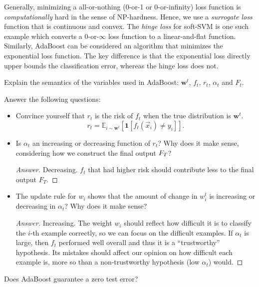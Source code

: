 \documentclass{discussion}
\newenvironment{answer}
  {\vspace{-1em}\begin{proof}[Answer]}
  {\end{proof}}
\begin{document}
Generally, minimizing a all-or-nothing (0-or-1 or 0-or-infinity) loss function is \emph{computationally} hard in the sense of NP-hardness. Hence, we use a \emph{surrogate loss} function that is continuous and convex. The \emph{hinge loss} for soft-SVM is one such example which converts a 0-or-$\infty$ loss function to a linear-and-flat function. Similarly, AdaBoost can be considered an algorithm that minimizes the exponential loss function. The key difference is that the exponential loss directly upper bounds the classification error, whereas the hinge loss does not.

\begin{exercise}
Explain the semantics of the variables used in AdaBoost: $\mathbf{w}^t$, $f_t$, $r_t$, $\alpha_t$ and $F_t$.
\end{exercise}

\begin{exercise} Answer the following questions:
\begin{itemize}
  \item Convince yourself that $r_t$ is the  risk of $f_t$ when the true distribution is $\mathbf{w}^t$.
    \[r_t = \mathbb{E}_{i \sim \mathbf{w}^t}\left[\mathbf{1}[f_t(\vec{x}_i) \neq y_i]\right].  \]
 \item Is $\alpha_t$ an increasing or decreasing function of $r_t$? Why does it make sense, considering how we construct the final output $F_T$?
 \begin{answer}
   Decreasing. $f_t$ that had higher risk should contribute less to the final output $F_T$.
 \end{answer}
 \item The update rule for $w_i$ shows that the amount of change in $w_i^t$ is increasing or decreasing in $\alpha_t$? Why does it make sense?
  \begin{answer}
   Increasing. The weight $w_i$ should reflect how difficult it is to classify the $i$-th example correctly, so we can focus on the difficult examples. If $\alpha_t$ is large, then $f_t$ performed well overall and thus it is a ``trustworthy'' hypothesis. Its mistakes should affect our opinion on how difficult each example is, more so than a non-trustworthy hypothesis (low $\alpha_t$) would.
 \end{answer}
\end{itemize}  
\end{exercise}

\begin{exercise}
Does AdaBoost guarantee a zero test error?
\end{exercise}
\end{document}
